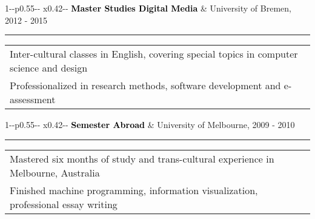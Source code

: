\documentclass[10pt,A4]{article}
\newcommand{\mpwidth}{\linewidth-\fboxsep-\fboxsep}
\newcommand{\tzlarrow}{(0,0) -- (0.2,0) -- (0.3,0.2) -- (0.2,0.4) -- (0,0.4) -- (0.1,0.2) -- cycle;}
\newcommand{\larrow}[1]
{\begin{tikzpicture}[scale=0.58]
         \filldraw[fill=#1!100,draw=#1!100!black]  \tzlarrow
 \end{tikzpicture}
}
\newcommand{\cvevent}[5]
{
\vspace{8pt}
        \begin{tabular*}{1\mpwidth}{p{0.55\mpwidth}  x{0.42\mpwidth}}
        \textcolor{black}{\textbf{#2}} & \textcolor{complcol}{#3}, \textcolor{bgcol}{#1} 

        \end{tabular*}
\vspace{-12pt}
\textcolor{softcol}{\hrule}
\vspace{6pt}
        \begin{tabular*}{0.5\mpwidth}{p{\mpwidth}}
\larrow{softcol}  #4\\[3pt]
\larrow{softcol}  #5\\[6pt]
        \end{tabular*}

}
\newcommand{\mystrut}{\rule[-.3\baselineskip]{0pt}{\baselineskip}}
\begin{document}
\begin{samepage}
{\begin{minipage}[r][0.7\textheight][t]{0.69\linewidth}
%
\cvevent{2012 - 2015}{Master Studies Digital Media}{University of Bremen}{Inter-cultural classes in English, covering special topics in computer science and design}{Professionalized in research methods, software development and e-assessment}


%
\cvevent{2009 - 2010}{Semester Abroad}{University of Melbourne}{Mastered six months of study and trans-cultural experience in Melbourne, Australia}{Finished machine programming, information visualization, professional essay writing}


\end{minipage}}


\end{samepage}


%
%
%
%
%
%
\end{document}
